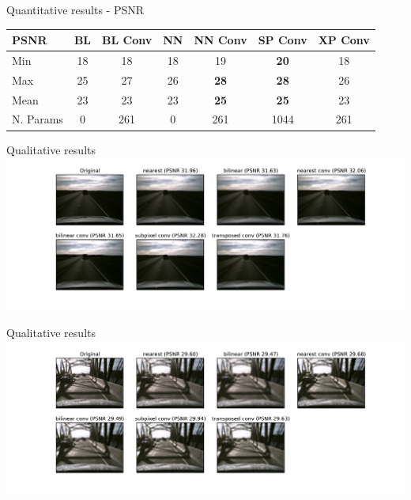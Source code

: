\documentclass[]{beamer}
\begin{document}
\begin{frame}{Quantitative results - PSNR}
\begin{tabular}{lcccccc}
\hline
{PSNR} &  BL &  BL Conv &  NN &  NN Conv &  SP Conv &  XP Conv \\
\hline
Min         &  18 &       18 &  18 &       19 &             \textbf{20} &               18 \\
Max         &  25 &       27 &  26 &       \textbf{28} &             \textbf{28} &               26 \\
Mean        &  23 &       23 &  23 &       \textbf{25} &             \textbf{25} &               23 \\
N. Params   &   0 &      261 &   0 &      261 &           1044 &              261 \\
\hline
\end{tabular}
\end{frame}

\begin{frame}{Qualitative results}
\includegraphics[width=1.0\textwidth]{figures/xposed-conv-highest-accuracy}
\end{frame}

\begin{frame}{Qualitative results}
\includegraphics[width=1.0\textwidth]{figures/bilinear-conv-lowest-accuracy}
\end{frame}
\end{document}
